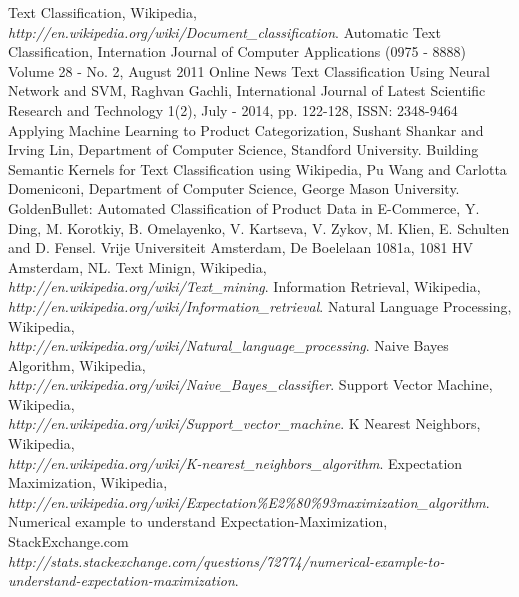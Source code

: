 \documentclass[12pt]{book}
\begin{document}
\begin{thebibliography}{12}
	  Text Classification, Wikipedia,
	  \emph {http://en.wikipedia.org/wiki/Document\_classification}.
	  Automatic Text Classification,
	  Internation Journal of Computer Applications (0975 - 8888)
	  Volume 28 - No. 2, August 2011
	  Online News Text Classification Using Neural Network and SVM,
	  Raghvan Gachli, International Journal of Latest Scientific Research and Technology 1(2), July - 2014, pp. 122-128, ISSN: 2348-9464
	  Applying Machine Learning to Product Categorization,
	  Sushant Shankar and Irving Lin,
	  Department of Computer Science, Standford University.
	  Building Semantic Kernels for Text Classification using Wikipedia,
	  Pu Wang and Carlotta Domeniconi,
	  Department of Computer Science, George Mason University.
	  GoldenBullet: Automated Classification of Product Data in E-Commerce,
	  Y. Ding, M. Korotkiy, B. Omelayenko, V. Kartseva, V. Zykov, M. Klien, E. Schulten and D. Fensel.
	  Vrije Universiteit Amsterdam, De Boelelaan 1081a, 1081 HV Amsterdam, NL.
	  Text Minign, Wikipedia,\\
	  \emph {http://en.wikipedia.org/wiki/Text\_mining}.
	  Information Retrieval, Wikipedia,\\
	  \emph {http://en.wikipedia.org/wiki/Information\_retrieval}.
	  Natural Language Processing, Wikipedia,\\
	  \emph {http://en.wikipedia.org/wiki/Natural\_language\_processing}.
	  Naive Bayes Algorithm, Wikipedia,\\
	  \emph {http://en.wikipedia.org/wiki/Naive\_Bayes\_classifier}.
	  Support Vector Machine, Wikipedia,\\
	  \emph {http://en.wikipedia.org/wiki/Support\_vector\_machine}.
	  K Nearest Neighbors, Wikipedia,\\
	  \emph {http://en.wikipedia.org/wiki/K-nearest\_neighbors\_algorithm}.
	  Expectation Maximization, Wikipedia,\\
	  \emph {http://en.wikipedia.org/wiki/Expectation\%E2\%80\%93maximization\_algorithm}.
	  Numerical example to understand Expectation-Maximization, StackExchange.com\\
	  \emph {http://stats.stackexchange.com/questions/72774/numerical-example-to-understand-expectation-maximization}.



\end{thebibliography} %
\end{document}
